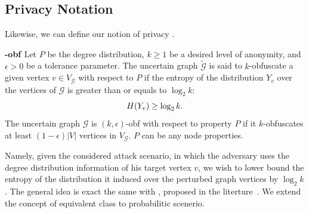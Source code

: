 \subsection{Privacy Notation}
Likewise, we can define our notion of privacy . 
\begin{definition}
    \textbf{-obf \cite{Bonchi_Identity_2014}}
    Let $P$ be the degree distribution, $k \geq 1$ be a desired level of anonymity, and $\epsilon >0 $ be a tolerance parameter. The uncertain graph $\tilde{\mathcal{G}}$ is said to $k$-obfuscate a given vertex $v \in V_{\mathcal{G}}$ with respect to $P$ if the entropy of the distribution $Y_{v}$ over the vertices of $\mathcal{G}$ is greater than or equals to $\log_{2}{k}$:
    \vj
    \begin{equation*}
        H(Y_{v}) \geq \log_{2}{k}.
    \label{obfCon}
    \svj
    \end{equation*}
The uncertain graph $\mathcal{G}$ is $(k,\epsilon)$-obf with respect to property $P$ if it $k$-obfuscates at least $(1-\epsilon)|V|$ vertices in $V_{\mathcal{G}}$. $P$ can be any node properties.  
\end{definition}
Namely, given the considered attack scenario, in which the adversary uses the degree distribution information of his target vertex $v$, we wish to lower bound the entropy of the distribution it induced over the perturbed graph vertices by $\log_{2}{k}$. The general idea is exact the same with {\keobf}, proposed in the literture~\cite{Bonchi_Identity_2014}. We extend the concept of equivalent class to probabilitic scenerio. 